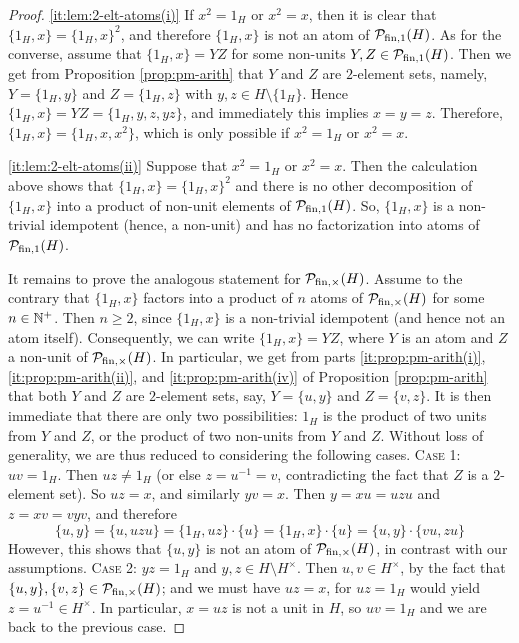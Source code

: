 \begin{proof}
\ref{it:lem:2-elt-atoms(i)} If $x^2 = 1_H$ or $x^2 = x$, then it is clear that $\{1_H,x\} = \{1_H,x\}^2$, and therefore $\{1_H,x\}$ is not an atom of $\mathcal P_{\textrm{fin}, 1}(H)$. As for the converse, assume that $\{1_H,x\} = YZ$ for some non-units $Y,Z \in \mathcal P_{\textrm{fin}, 1}(H)$. Then we get from Proposition \ref{prop:pm-arith} that $Y$ and $Z$ are $2$-element sets, namely, $Y = \{1_H, y\}$ and $Z = \{1_H, z\}$ with $y,z \in H \setminus \{1_H\}$. Hence $\{1_H,x\} = YZ = \{1_H,y,z,yz\}$, and immediately this implies $x=y=z$. Therefore, $\{1_H,x\} = \{1_H,x,x^2\}$, which is only possible if $x^2 = 1_H$ or $x^2 = x$.

\ref{it:lem:2-elt-atoms(ii)} Suppose that $x^2 = 1_H$ or $x^2 = x$. Then the calculation above shows that $\{1_H,x\} = \{1_H,x\}^2$ and there is no other decomposition of $\{1_H,x\}$ into a product of non-unit elements of $\mathcal P_{\textrm{fin},1}(H)$. So, $\{1_H,x\}$ is a non-trivial idempotent (hence, a non-unit) and has no factorization into atoms of $\mathcal P_{\textrm{fin},1}(H)$.

It remains to prove the analogous statement for $\mathcal P_{\textrm{fin},\times}(H)$.
{Assume to the} contrary that $\{1_H,x\}$ factors into a product of $n$ atoms of $\mathcal P_{\textrm{fin},\times}(H)$ for some $n \in \mathbb{N}^+$. Then $n \ge 2$, since $\{1_H, x\}$ is a non-trivial idempotent (and hence not an atom itself). Consequently, we can write $\{1_H,x\} = YZ$, where $Y$ is an atom and $Z$ a non-unit of $\mathcal P_{\textrm{fin},\times}(H)$. In particular, we get from parts \ref{it:prop:pm-arith(i)}, \ref{it:prop:pm-arith(ii)}, and \ref{it:prop:pm-arith(iv)} of Proposition \ref{prop:pm-arith} that both $Y$ and $Z$ are $2$-element sets, say, $Y = \{u, y\}$ and $Z = \{v, z\}$. It is then immediate that there are only two possibilities: $1_H$ is the product of two units from $Y$ and $Z$, or the product of two non-units from $Y$ and $Z$.
Without loss of generality, we are thus reduced to considering the following cases.
\vskip 0.1cm
\textsc{Case 1:} $uv=1_H$. Then $uz \ne 1_H$ (or else $z = u^{-1} = v$, contradicting the fact that $Z$ is a $2$-element set). So $uz=x$, and similarly $yv=x$. Then $y = xu = uzu$ and $z = xv = vyv$, and therefore
\[
\{u,y\} = \{u,uzu\} = \{1_H,uz\}\cdot \{u\} = \{1_H,x\}\cdot\{u\} = \{u,y\}\cdot \{vu,zu\}
\]
However, this shows that $\{u,y\}$ is not an atom of $\mathcal{P}_{\textrm{fin}, \times}(H)$, in contrast with our assumptions.
\vskip 0.1cm
\textsc{Case 2:}
$yz = 1_H$ and $y,z\in H\setminus H^\times$. Then $u,v\in H^\times$, by the fact that $\{u, y\}, \{v, z\} \in \mathcal P_{\textrm{fin},\times}(H)$; and we must have $uz=x$, for $uz=1_H$ would yield $z = u^{-1}\in H^\times$.
In particular, $x = uz$ is not a unit in $H$, so $uv=1_H$ and we are back to the previous case.
\end{proof}
